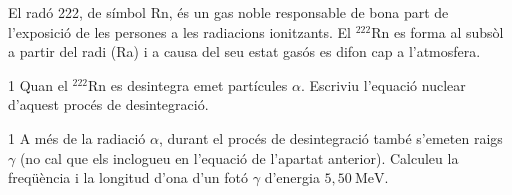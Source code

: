El radó 222, de símbol Rn, és un gas noble responsable de bona part de l'exposició de les persones a les radiacions ionitzants. El $^{222}\mathrm{Rn}$ es forma al subsòl a partir del radi (Ra) i a causa del seu estat gasós es difon cap a l'atmosfera.

\begin{apartat}{1}
Quan el $^{222}\mathrm{Rn}$ es desintegra emet partícules $\alpha$. Escriviu l'equació nuclear d'aquest procés de desintegració.
\end{apartat}

\begin{apartat}{1}
A més de la radiació $\alpha$, durant el procés de desintegració també s'emeten raigs $\gamma$ (no cal que els inclogueu en l'equació de l'apartat anterior). Calculeu la freqüència i la longitud d'ona d'un fotó $\gamma$ d'energia $5,50\ \mathrm{MeV}$.
\end{apartat}

